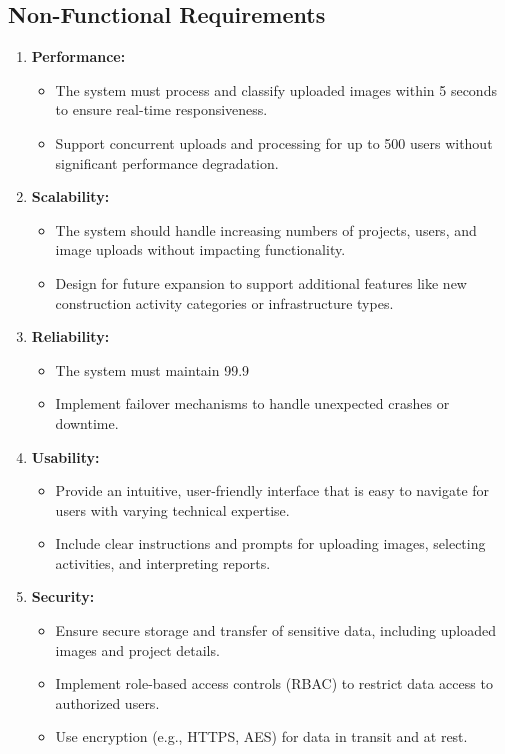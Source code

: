 \subsection{Non-Functional Requirements}
\begin{enumerate}
    \item \textbf{Performance:}
    \begin{itemize}
        \item The system must process and classify uploaded images within 5 seconds to ensure real-time responsiveness.
        \item Support concurrent uploads and processing for up to 500 users without significant performance degradation.
    \end{itemize}
    \item \textbf{Scalability:}
    \begin{itemize}
        \item The system should handle increasing numbers of projects, users, and image uploads without impacting functionality.
        \item Design for future expansion to support additional features like new construction activity categories or infrastructure types.
    \end{itemize}
    \item \textbf{Reliability:}
    \begin{itemize}
        \item The system must maintain 99.9%
        \item Implement failover mechanisms to handle unexpected crashes or downtime.
    \end{itemize}
    \item \textbf{Usability:}
    \begin{itemize}
        \item Provide an intuitive, user-friendly interface that is easy to navigate for users with varying technical expertise.
        \item Include clear instructions and prompts for uploading images, selecting activities, and interpreting reports.
    \end{itemize}
    \item \textbf{Security:}
    \begin{itemize}
        \item Ensure secure storage and transfer of sensitive data, including uploaded images and project details.
        \item Implement role-based access controls (RBAC) to restrict data access to authorized users.
        \item Use encryption (e.g., HTTPS, AES) for data in transit and at rest.
    \end{itemize}
\end{enumerate}

